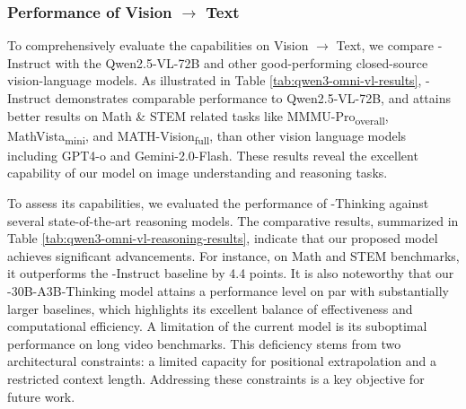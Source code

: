 \subsubsection{Performance of Vision $\to$ Text}
To comprehensively evaluate the capabilities on Vision $\to$ Text, we compare \method-Instruct with the Qwen2.5-VL-72B and other good-performing closed-source vision-language models. As illustrated in Table \ref{tab:qwen3-omni-vl-results}, \method-Instruct demonstrates comparable performance to Qwen2.5-VL-72B, and attains better results on Math \& STEM related tasks like MMMU-Pro\textsubscript{overall}, MathVista\textsubscript{mini}, and MATH-Vision\textsubscript{full},  than other vision language models including GPT4-o and Gemini-2.0-Flash. These results reveal the excellent capability of our model on image understanding and reasoning tasks. 

To assess its capabilities, we evaluated the performance of \method-Thinking against several state-of-the-art reasoning models. The comparative results, summarized in Table \ref{tab:qwen3-omni-vl-reasoning-results}, indicate that our proposed model achieves significant advancements. For instance, on Math and STEM benchmarks, it outperforms the \method-Instruct baseline by 4.4 points. It is also noteworthy that our \method-30B-A3B-Thinking model attains a performance level on par with substantially larger baselines, which highlights its excellent balance of effectiveness and computational efficiency.
A limitation of the current model is its suboptimal performance on long video benchmarks. This deficiency stems from two architectural constraints: a limited capacity for positional extrapolation and a restricted context length. Addressing these constraints is a key objective for future work.


\vspace{-.1in}





